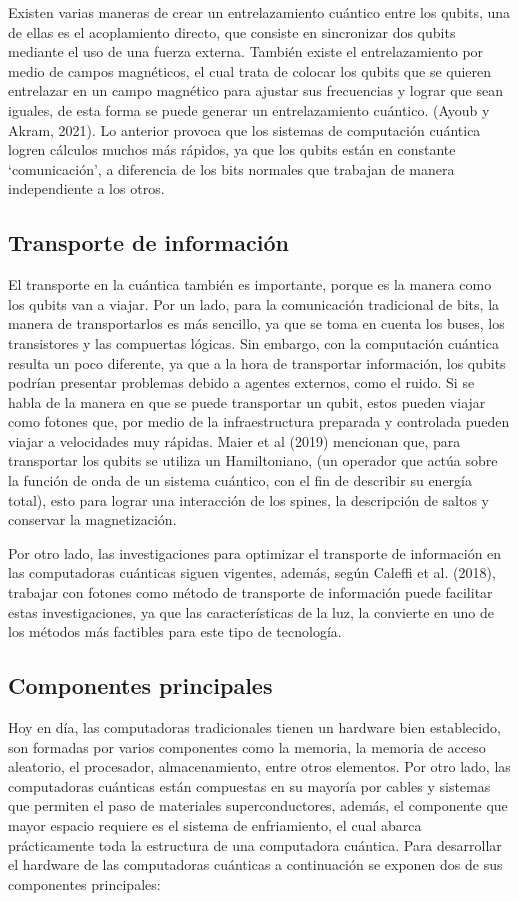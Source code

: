 \documentclass[twoside]{article}
\begin{document}
Existen varias maneras de crear un entrelazamiento cuántico entre los qubits, una de ellas es el acoplamiento directo, que consiste en sincronizar dos qubits mediante el uso de una fuerza externa. También existe el entrelazamiento por medio de campos magnéticos, el cual trata de colocar los qubits que se quieren entrelazar en un campo magnético para ajustar sus frecuencias y lograr que sean iguales, de esta forma se puede generar un entrelazamiento cuántico. (Ayoub y Akram, 2021). Lo anterior provoca que los sistemas de computación cuántica logren cálculos muchos más rápidos, ya que los qubits están en constante ‘comunicación’, a diferencia de los bits normales que trabajan de manera independiente a los otros. 

\subsection{Transporte de información}
El transporte en la cuántica también es importante, porque es la manera como los qubits van a viajar. Por un lado, para la comunicación tradicional de bits, la manera de transportarlos es más sencillo, ya que se toma en cuenta los buses, los transistores y las compuertas lógicas. Sin embargo, con la computación cuántica resulta un poco diferente, ya que a la hora de transportar información, los qubits podrían presentar problemas debido a agentes externos, como el ruido.
Si se habla de la manera en que se puede transportar un qubit, estos pueden viajar como fotones que, por medio de la infraestructura preparada y controlada pueden viajar a velocidades muy rápidas. Maier et al (2019) mencionan que, para transportar los qubits se utiliza un Hamiltoniano, (un operador que actúa sobre la función de onda de un sistema cuántico, con el fin de describir su energía total), esto para lograr una interacción de los spines, la descripción de saltos y conservar la magnetización.

Por otro lado, las investigaciones para optimizar el transporte de información en las computadoras cuánticas siguen vigentes, además, según Caleffi et al. (2018), trabajar con fotones como método de transporte de información puede facilitar estas investigaciones, ya que las características de la luz, la convierte en uno de los métodos más factibles para este tipo de tecnología.

\subsection{Componentes principales}
Hoy en día, las computadoras tradicionales tienen un hardware bien establecido, son formadas por varios componentes como la memoria, la memoria de acceso aleatorio, el procesador, almacenamiento, entre otros elementos.
Por otro lado, las computadoras cuánticas están compuestas en su mayoría por cables y sistemas que permiten el paso de materiales superconductores, además, el componente que mayor espacio requiere es el sistema de enfriamiento, el cual abarca prácticamente toda la estructura de una computadora cuántica. Para desarrollar el hardware de las computadoras cuánticas a continuación se exponen dos de sus componentes principales:
\end{document}

